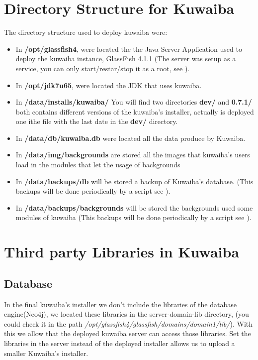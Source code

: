 \documentclass[a4paper]{article}
\begin{document}
	\section{Directory Structure for Kuwaiba} \label{sec:directories_structure}
		The directory structure used to deploy kuwaiba were: 
		\begin{itemize}
			\item In \textbf{/opt/glassfish4}, were located the the Java Server Application used to deploy the kuwaiba instance, GlassFish 4.1.1 (The server was setup as a service, you can only start/restar/stop it as a root, see \textbf{}). 
			\item In \textbf{/opt/jdk7u65}, were located the JDK that uses kuwaiba.
			\item In \textbf{/data/installs/kuwaiba/} You will find two directories \textbf{dev/} and \textbf{0.7.1/} both contains different versions of the kuwaiba's installer, actually is deployed one ithe file with the last date in the \textbf{dev/} directory.
			\item In \textbf{/data/db/kuwaiba.db} were located all the data produce by Kuwaiba.
			\item In \textbf{/data/img/backgrounds} are stored all the images that kuwaiba's users load in the modules that let the usage of backgrounds 
			\item In \textbf{/data/backups/db} will be stored a backup of Kuwaiba's database. (This backups will be done periodically by a script see \textbf{}). 
			\item In \textbf{/data/backups/backgrounds} will be stored the backgrounds used some modules of kuwaiba (This backups will be done periodically by a script see \textbf{}). 
	    \end{itemize}

	\section{Third party Libraries in Kuwaiba} \label{sec:third_party_libs}
		\subsection{Database}
	    In the final kuwaiba's installer we don't include the libraries of the database engine(Neo4j), we located these libraries in the server-domain-lib directory, (you could check it in the path \textit{/opt/glassfish4/glassfish/domains/domain1/lib/}). With this we allow that the deployed kuwaiba server can access those libraries.
	    Set the libraries in the server instead of the deployed installer allows us to upload a smaller Kuwaiba's installer.
	
\end{document}
